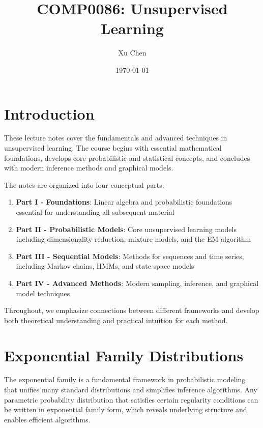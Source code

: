 \documentclass[12pt,a4paper]{article}
\title{COMP0086: Unsupervised Learning}
\author{Xu Chen}
\date{\today}
\theoremstyle{definition}
\begin{document}
\maketitle
\tableofcontents
\newpage

\section*{Introduction}

These lecture notes cover the fundamentals and advanced techniques in unsupervised learning. The course begins with essential mathematical foundations, develops core probabilistic and statistical concepts, and concludes with modern inference methods and graphical models.

The notes are organized into four conceptual parts:

\begin{enumerate}
    \item \textbf{Part I - Foundations}: Linear algebra and probabilistic foundations essential for understanding all subsequent material
    \item \textbf{Part II - Probabilistic Models}: Core unsupervised learning models including dimensionality reduction, mixture models, and the EM algorithm
    \item \textbf{Part III - Sequential Models}: Methods for sequences and time series, including Markov chains, HMMs, and state space models
    \item \textbf{Part IV - Advanced Methods}: Modern sampling, inference, and graphical model techniques
\end{enumerate}

Throughout, we emphasize connections between different frameworks and develop both theoretical understanding and practical intuition for each method.

\newpage


\section{Exponential Family Distributions}

The exponential family is a fundamental framework in probabilistic modeling that unifies many standard distributions and simplifies inference algorithms. Any parametric probability distribution that satisfies certain regularity conditions can be written in exponential family form, which reveals underlying structure and enables efficient algorithms.
\end{document}
